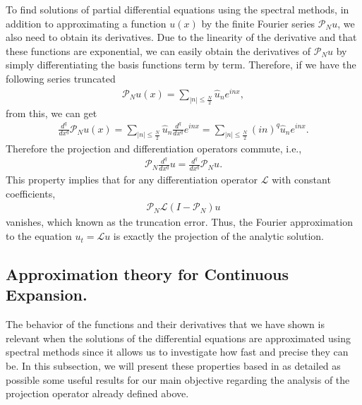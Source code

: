 	To find solutions of partial differential equations using the spectral methods, in addition to approximating a function $u(x)$ by the finite Fourier series $\mathcal{P}_N u$, we also need to obtain its derivatives. Due to the linearity of the derivative and that these functions are exponential, we can easily obtain the derivatives of $\mathcal{P}_N u$ by simply differentiating the basis functions term by term. Therefore, if we have the following series truncated \\
 	\begin{align*}
   		\mathcal{P}_N u(x) =  \displaystyle \sum_{ |n| \leq \frac {N}{2}} \hat{u}_{n} e^{inx},
   	\end{align*}
    from this, we can get
   	\begin{align*}
   		\frac{d^q}{dx^q} \mathcal{P}_N u(x) = \displaystyle \sum_{ |n| \leq \frac {N}{2}} \hat{u}_{n} \frac{d^q}{dx^q} e^{inx} = \displaystyle \sum_{ |n| \leq \frac {N}{2}} (in)^q \hat{u}_{n}e^{inx}.
   	\end{align*}
    Therefore the projection and differentiation operators commute, i.e.,
    	\begin{align*}
    	\mathcal{P}_N \frac{d^q}{dx^q} u = \frac{d^q}{dx^q}\mathcal{P}_N u.
    	\end{align*}
    This property implies that for any differentiation operator $\mathcal{L}$ with constant coefficients,	
    	\begin{align*}
    	\mathcal{P}_N \mathcal{L} (I - \mathcal{P}_N)u
    	\end{align*}
     vanishes, which known as the truncation error. Thus, the Fourier approximation to the equation $u_t = \mathcal{L}u$ is exactly the projection of the analytic solution. 

    \subsection{Approximation theory for Continuous Expansion.}
    
    The behavior of the functions and their derivatives that we have shown is relevant when the solutions of the differential equations are approximated using spectral methods since it allows us to investigate how fast and precise they can be. In this subsection, we will present these properties based in \cite{gottlieb2007} as detailed as possible some useful results for our main objective regarding the analysis of the projection operator already defined above. \\
    
